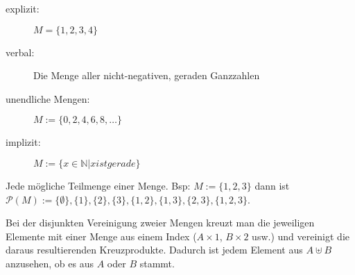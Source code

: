 \vspace{-1cm}

\begin{framed} 
  \begin{description}
    \item [explizit:] $M = \{1,2,3,4\}$
    \item [verbal:] \dq{}Die Menge aller nicht-negativen, geraden Ganzzahlen\dq{}
    \item [unendliche Mengen:] $M := \{0,2,4,6,8,\dots\}$
    \item [implizit:] $M := \{x \in \mathbb{N} | x ist gerade\}$
  \end{description}
\end{framed}

\vspace{-.6cm}

\begin{framed} [Potenzmenge:] 
  Jede mögliche Teilmenge einer Menge. Bsp: $M := \{1,2,3\}$ dann ist
  $\mathcal{P}(M) := \{\emptyset\},\{1\},\{2\},\{3\},\{1,2\},\{1,3\},\{2,3\},\{1,2,3\}$.
\end{framed}

\vspace{-.6cm}

\begin{framed}  
    Bei der disjunkten Vereinigung zweier Mengen kreuzt man die jeweiligen 
    Elemente mit einer Menge aus einem Index ($A \times {1}$, $B \times {2}$ usw.) 
    und vereinigt die daraus resultierenden Kreuzprodukte. 
    Dadurch ist jedem Element aus $A \uplus B$ anzusehen, ob es aus $A$ oder $B$ 
    stammt.
\end{framed}
